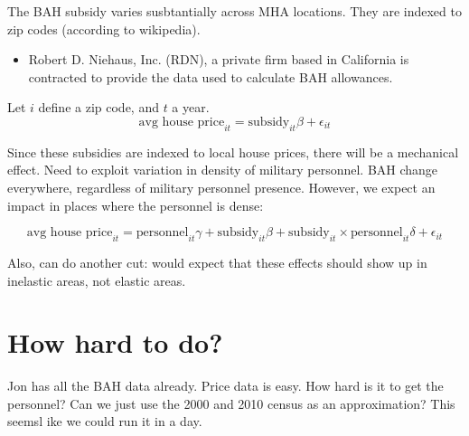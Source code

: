 \documentclass{article}
\begin{document}
The BAH subsidy varies susbtantially across MHA locations. They are indexed to zip codes (according to wikipedia). 
\begin{itemize}
\item Robert D. Niehaus, Inc. (RDN), a private firm based in California is contracted to provide the data used to calculate BAH allowances.
\end{itemize}
Let $i$ define a zip code, and $t$ a year. 
\begin{equation}
  \text{avg house price}_{it} = \text{subsidy}_{it}\beta + \epsilon_{it}
\end{equation}

Since these subsidies are indexed to local house prices, there will be a mechanical effect. Need to exploit variation in density of military personnel. BAH change everywhere, regardless of military personnel presence. However, we expect an impact in places where the personnel is dense:

\begin{equation}
  \text{avg house price}_{it} = \text{personnel}_{it}\gamma + \text{subsidy}_{it}\beta + \text{subsidy}_{it}\times \text{personnel}_{it} \delta + \epsilon_{it}
\end{equation}


Also, can do another cut: would expect that these effects should show up in inelastic areas, not elastic areas. 

\section{How hard to do?}
Jon has all the BAH data already. Price data is easy. How hard is it
to get the personnel? Can we just use the 2000 and 2010 census as an
approximation? This seemsl ike we could run it in a day.
\end{document}
